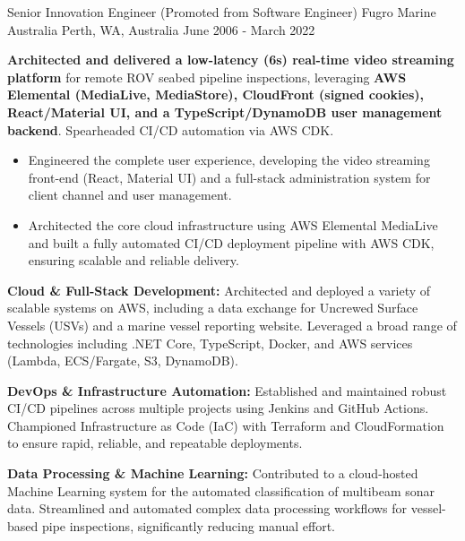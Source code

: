 \begin{cventries}
{\begin{cvitems}
      \end{cvitems}
    }
  \cventry
    {Senior Innovation Engineer (Promoted from Software Engineer)} %
    {Fugro Marine Australia} %
    {Perth, WA, Australia} %
    {June 2006 - March 2022} %
    {
      \begin{cvitems} %
        \item {\textbf{Architected and delivered a low-latency (6s) real-time video streaming platform} for remote ROV seabed pipeline inspections, leveraging \textbf{AWS Elemental (MediaLive, MediaStore), CloudFront (signed cookies), React/Material UI, and a TypeScript/DynamoDB user management backend}. Spearheaded CI/CD automation via AWS CDK.}
          \begin{itemize}
            \item {Engineered the complete user experience, developing the video streaming front-end (React, Material UI) and a full-stack administration system for client channel and user management.}
            \item {Architected the core cloud infrastructure using AWS Elemental MediaLive and built a fully automated CI/CD deployment pipeline with AWS CDK, ensuring scalable and reliable delivery.}
          \end{itemize}
        \item {\textbf{Cloud \& Full-Stack Development:} Architected and deployed a variety of scalable systems on AWS, including a data exchange for Uncrewed Surface Vessels (USVs) and a marine vessel reporting website. Leveraged a broad range of technologies including .NET Core, TypeScript, Docker, and AWS services (Lambda, ECS/Fargate, S3, DynamoDB).}
        \item {\textbf{DevOps \& Infrastructure Automation:} Established and maintained robust CI/CD pipelines across multiple projects using Jenkins and GitHub Actions. Championed Infrastructure as Code (IaC) with Terraform and CloudFormation to ensure rapid, reliable, and repeatable deployments.}
        \item {\textbf{Data Processing \& Machine Learning:} Contributed to a cloud-hosted Machine Learning system for the automated classification of multibeam sonar data. Streamlined and automated complex data processing workflows for vessel-based pipe inspections, significantly reducing manual effort.}

\end{cvitems}}
\end{cventries}
